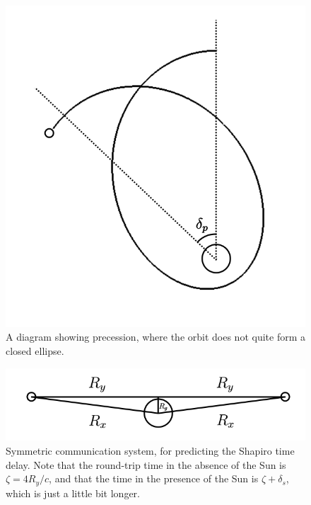 \documentclass[12pt]{article}
\begin{document}
\begin{figure} 
\centering
\label{fig4}
  \includegraphics[width = 6 in]{precession.png}
  \caption{ A diagram showing precession, where the orbit does not quite form a closed ellipse.
}
\end{figure}



\begin{figure} 
\centering
\label{fig5}
  \includegraphics[width = 6 in]{comm.png}
  \caption{ Symmetric communication system, for predicting the Shapiro time delay.
Note that the round-trip time in the absence of the Sun is $\zeta = 4 R_y / c$, and that the time in the presence of the Sun is $\zeta + \delta_{s}$, which is just a little bit longer.
}
\end{figure}
\end{document}
